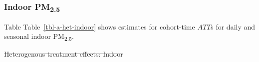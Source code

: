 \documentclass[
  letterpaper,
  DIV=11,
  numbers=noendperiod]{scrartcl}
\makeatletter
\renewenvironment{table}%
   {\renewcommand\familydefault\sfdefault
    \@float{table}}
   {\end@float}
\providecommand{\DIFdel}[1]{{\protect\color{red}\sout{#1}}}                      %
\providecommand{\DIFaddbegin}{} %
\providecommand{\DIFaddend}{} %
\providecommand{\DIFdelbegin}{} %
\providecommand{\DIFdelend}{} %
\providecommand{\DIFdelFL}[1]{\DIFdel{#1}} %
\newcommand{\DIFscaledelfig}{0.5}
\newlength{\DIFdelgraphicswidth} %
\newlength{\DIFdelgraphicsheight} %
\newcommand{\DIFaddincludegraphics}[2][]{{\color{blue}\fbox{\DIFOincludegraphics[#1]{#2}}}} %
\newcommand{\DIFdelincludegraphics}[2][]{%
\sbox{\DIFdelgraphicsbox}{\DIFOincludegraphics[#1]{#2}}%
\settoboxwidth{\DIFdelgraphicswidth}{\DIFdelgraphicsbox} %
\settoboxtotalheight{\DIFdelgraphicsheight}{\DIFdelgraphicsbox} %
\scalebox{\DIFscaledelfig}{%
\parbox[b]{\DIFdelgraphicswidth}{\usebox{\DIFdelgraphicsbox}\\[-\baselineskip] \rule{\DIFdelgraphicswidth}{0em}}\llap{\resizebox{\DIFdelgraphicswidth}{\DIFdelgraphicsheight}{%
\setlength{\unitlength}{\DIFdelgraphicswidth}%
\begin{picture}(1,1)%
\thicklines\linethickness{2pt} %
{\color[rgb]{1,0,0}\put(0,0){\framebox(1,1){}}}%
{\color[rgb]{1,0,0}\put(0,0){\line( 1,1){1}}}%
{\color[rgb]{1,0,0}\put(0,1){\line(1,-1){1}}}%
\end{picture}%
}\hspace*{3pt}}} %
} %
\DeclareRobustCommand{\DIFaddbegin}{\DIFOaddbegin \let\includegraphics\DIFaddincludegraphics} %
\DeclareRobustCommand{\DIFaddend}{\DIFOaddend \let\includegraphics\DIFOincludegraphics} %
\DeclareRobustCommand{\DIFdelbegin}{\DIFOdelbegin \let\includegraphics\DIFdelincludegraphics} %
\DeclareRobustCommand{\DIFdelend}{\DIFOaddend \let\includegraphics\DIFOincludegraphics} %
\makeatother
\begin{document}
\DIFdelbegin %
\DIFdelend \DIFaddbegin \subsubsection{\texorpdfstring{Indoor
PM\textsubscript{2.5}}{Indoor PM2.5}}\label{indoor-pm2.5-1}
\DIFaddend 

Table Table~\ref{tbl-a-het-indoor} shows estimates for cohort-time
\(ATT\)s for daily and seasonal indoor PM\textsubscript{2.5}.

\DIFdelbegin %
{%
\DIFdelFL{Heterogenous treatment effects: Indoor }}%
\end{document}
